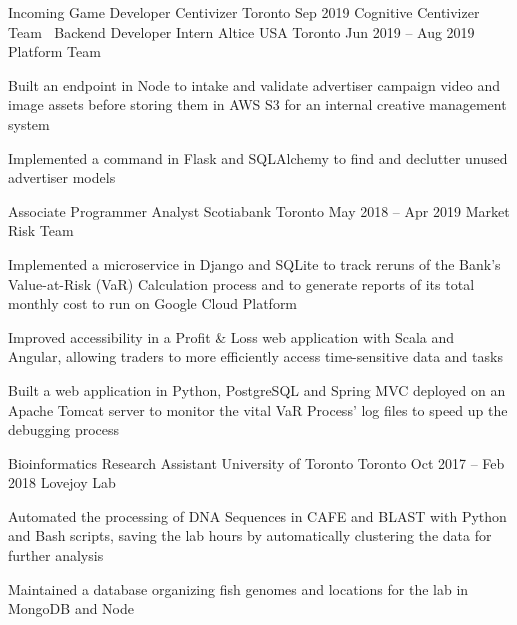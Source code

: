 \begin{cventries}
  \cventry
    {Incoming Game Developer}
    {Centivizer}
    {Toronto}
    {Sep 2019}
    {Cognitive Centivizer Team}
    {
      $\:$
    }
  \cventry
    {Backend Developer Intern}
    {Altice USA}
    {Toronto}
    {Jun 2019 -- Aug 2019}
    {Platform Team}
    {
    \begin{cvitems}
      \item {Built an endpoint in Node to intake and validate advertiser campaign video and image assets before storing them in AWS S3 for an internal creative management system}
      \item {Implemented a command in Flask and SQLAlchemy to find and declutter unused advertiser models}
    \end{cvitems}
    }
  \cventry
    {Associate Programmer Analyst}
    {Scotiabank}
    {Toronto}
    {May 2018 -- Apr 2019}
    {Market Risk Team}
    {
      \begin{cvitems}
        \item {Implemented a microservice in Django and SQLite to track reruns of the Bank's Value-at-Risk (VaR) Calculation process and to generate reports of its total monthly cost to run on Google Cloud Platform}
        \item {Improved accessibility in a Profit \& Loss web application with Scala and Angular, allowing traders to more efficiently access time-sensitive data and tasks}
        \item {Built a web application in Python, PostgreSQL and Spring MVC deployed on an Apache Tomcat server to monitor the vital VaR Process' log files to speed up the debugging process}
      \end{cvitems}
    }

  \cventry
    {Bioinformatics Research Assistant}
    {University of Toronto}
    {Toronto}
    {Oct 2017 -- Feb 2018}
    {Lovejoy Lab}
    {
      \begin{cvitems}
        \item {Automated the processing of DNA Sequences in CAFE and BLAST with Python and Bash scripts, saving the lab hours by automatically clustering the data for further analysis}
        \item {Maintained a database organizing fish genomes and locations for the lab in MongoDB and Node}
      \end{cvitems}
    }
\end{cventries}
